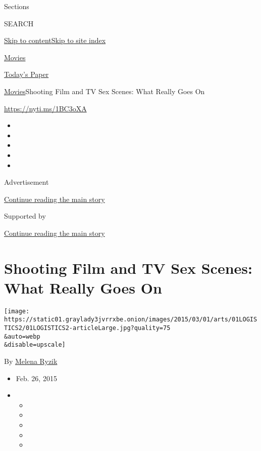 Sections

SEARCH

\protect\hyperlink{site-content}{Skip to
content}\protect\hyperlink{site-index}{Skip to site index}

\href{https://www.nytimes3xbfgragh.onion/section/movies}{Movies}

\href{https://myaccount.nytimes3xbfgragh.onion/auth/login?response_type=cookie\&client_id=vi}{}

\href{https://www.nytimes3xbfgragh.onion/section/todayspaper}{Today's
Paper}

\href{/section/movies}{Movies}\textbar{}Shooting Film and TV Sex Scenes:
What Really Goes On

\url{https://nyti.ms/1BC3oXA}

\begin{itemize}
\item
\item
\item
\item
\item
\end{itemize}

Advertisement

\protect\hyperlink{after-top}{Continue reading the main story}

Supported by

\protect\hyperlink{after-sponsor}{Continue reading the main story}

\hypertarget{shooting-film-and-tv-sex-scenes-what-really-goes-on}{%
\section{Shooting Film and TV Sex Scenes: What Really Goes
On}\label{shooting-film-and-tv-sex-scenes-what-really-goes-on}}

\texttt{[image: https://static01.graylady3jvrrxbe.onion/images/2015/03/01/arts/01LOGISTICS2/01LOGISTICS2-articleLarge.jpg?quality=75\\\&auto=webp\\\&disable=upscale]}

By \href{http://www.nytimes3xbfgragh.onion/by/melena-ryzik}{Melena
Ryzik}

\begin{itemize}
\item
  Feb. 26, 2015
\item
  \begin{itemize}
  \item
  \item
  \item
  \item
  \item
  \end{itemize}
\end{itemize}

